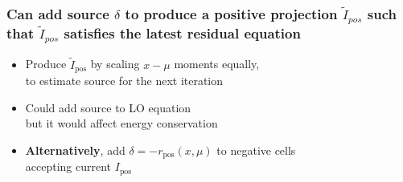 \documentclass[xcolor=dvipsnames,hyperref={pdfpagelabels=false},unknownkeysallowed]{beamer}
\newcommand{\colb}[1]{{\color{blue} #1}}
\newcommand{\colG}[1]{{\color{Gray!110} #1}}
\newlength{\wideitemsep}
\let\olditem\item
\renewcommand{\item}{\setlength{\itemsep}{\wideitemsep}\olditem}
\newcommand{\B}[1]{\ensuremath{\mathbf{#1}}}
\begin{document}
\begin{frame}
    \frametitle{Can add source $\delta$ to produce a positive projection $\tilde I_{pos}$ 
        such that $\tilde I_{pos}$ satisfies the
    latest residual equation}
    {\addtolength\wideitemsep{0.1in}
    \begin{itemize} 
        \item[] Produce $\tilde I_{\text{pos}}$ by scaling $x-\mu$ moments equally,
            \\ \colG{to estimate source for the next iteration\vspace{0.1in}}
        \item[] Could add source to LO equation \\ \colG{but it would affect energy conservation}
        \item[]\pause \textbf{Alternatively}, add $\delta = -r_{\text{pos}}(x,\mu)$ to negative cells
            \\ \colG{accepting current $I_{\text{pos}}$}
    \end{itemize}
}
\end{frame}
\end{document}
